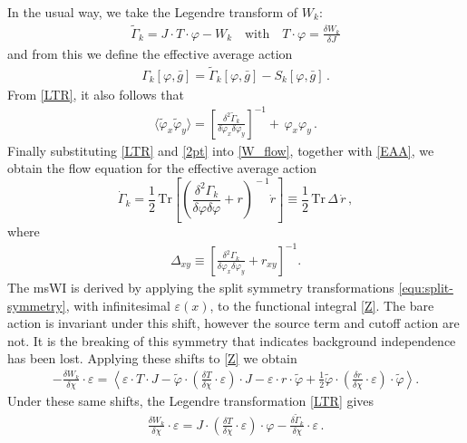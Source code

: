 \documentclass[11pt,draft]{book} %
\begin{document}
In the usual way, we take the Legendre transform of $W_k$:
\begin{align}
	\tilde\Gamma_{k} = J\cdot T \cdot \varphi - W_k
  \quad \text{with} \quad
  T\cdot\varphi=\frac{\delta W_k}{\delta J}
	\label{LTR}
\end{align}
and from this we define the effective average action
\begin{align}
 	\Gamma_k[\varphi,\bar g]=\tilde\Gamma_k[\varphi,\bar g]-S_k[\varphi,\bar g] \,.
	\label{EAA}
\end{align}
From \eqref{LTR}, it also follows that
\begin{align}
  \langle\tilde\varphi_x \tilde\varphi_y \rangle =
  \left[
    \frac{\delta^{2}\tilde\Gamma_k}{\delta\varphi_x \delta\varphi_y}
  \right]^{-1}
  +\,\varphi_x \varphi_y \,.
  \label{2pt}
\end{align}
Finally substituting \eqref{LTR} and \eqref{2pt} into \eqref{W_flow}, together with \eqref{EAA},
we obtain the flow equation for the effective average action
\begin{equation}
  \dot \Gamma_k = \frac{1}{2} \, \mathrm{Tr}
  \left[
    \left(
      \frac{\delta^{2}\Gamma_k}{\delta\varphi \delta\varphi} +r
    \right)^{\!-1}\dot r
  \right]
	\equiv \frac{1}{2} \, \mathrm{Tr}\,\Delta\, \dot r \,,
	\label{flow1}
\end{equation}
where
\begin{align}
  \Delta_{xy}\equiv\left[\frac{\delta^{2}\Gamma_k}{\delta\varphi_x \delta\varphi_y}+r_{xy}\right]^{-1} .
  \label{new-inverse}
\end{align}
The msWI is derived by applying the  split symmetry transformations \eqref{equ:split-symmetry},
with infinitesimal $\varepsilon(x)$, to the functional integral \eqref{Z}.
The bare action is invariant under this shift, however the source term and cutoff action are not.
It is the breaking of this symmetry that indicates background independence has been lost.
Applying these shifts to \eqref{Z} we obtain
\begin{align}
	-\frac{\delta W_k}{\delta\chi}\cdot\varepsilon=\left< \varepsilon\cdot T\cdot J-
	\tilde\varphi\cdot\left(\frac{\delta T}{\delta\chi}\cdot\varepsilon\right)\cdot J
	- \varepsilon\cdot r\cdot\tilde\varphi
	+\frac{1}{2}\tilde\varphi\cdot\left(\frac{\delta r}{\delta\chi}\cdot\varepsilon\right)\cdot\tilde\varphi\right>.
	\label{Wshift}
\end{align}
Under these same shifts, the Legendre transformation \eqref{LTR} gives
\begin{align}
	\frac{\delta W_k}{\delta\chi}\cdot\varepsilon
	= J\cdot\left(\frac{\delta T}{\delta\chi}\cdot\varepsilon\right)\cdot\varphi
	- \frac{\delta\tilde\Gamma_k}{\delta\chi}\cdot\varepsilon \,.
\end{align}
\end{document}
